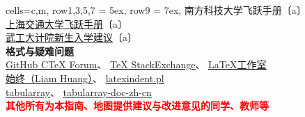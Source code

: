 \begin{table}[H]
\begin{tblr}[
            tall,
            theme = {no-caption},
            note{1} = {符号含义：\newline〔a〕:已获编委（主编）授权；〔b〕：已询问，暂未答复；〔c〕：未能联系到作者。},
        ]{
            cells={c,m},
            row{1,3,5,7} = {5ex},
            row{9} = {7ex},
        }
{{{        南方科技大学飞跃手册}}〔a〕                                                               \\
        \uline{\href{https://github.com/SurviveSJTU/SJTU-Application}{%
        上海交通大学飞跃手册}}〔a〕                                                               \\
        \uline{\href{https://gitee.com/hanyaner/WITjsj}{%
        武工大计院新生入学建议}}〔a〕}                                                            \\
        {\large\textbf{格式与疑难问题}}                                                           \\
        {
        {\uline{\href{https://github.com/CTeX-org/forum/issues}{GitHub CTeX Forum}}、%
                \uline{\href{https://tex.stackexchange.com}{TeX StackExchange}}、%
        \uline{\href{https://www.latexstudio.net}{LaTeX工作室}}}                                  \\
        {\uline{\href{https://liam.page}{始终（Liam Huang）}}、%
        \uline{\href{https://ctan.org/pkg/latexindent}{latexindent.pl}}}                          \\
        {\uline{\href{https://github.com/lvjr/tabularray}{tabularray}}、%
        \uline{\href{https://gitee.com/nwafu_nan/tabularray-doc-zh-cn}{tabularray-doc-zh-cn}}}
        }                                                                                         \\
        {\large\textbf{\textcolor{red}{其他所有为本指南、地图提供建议与改进意见的同学、教师等}}}
    \end{tblr}


\end{table}
